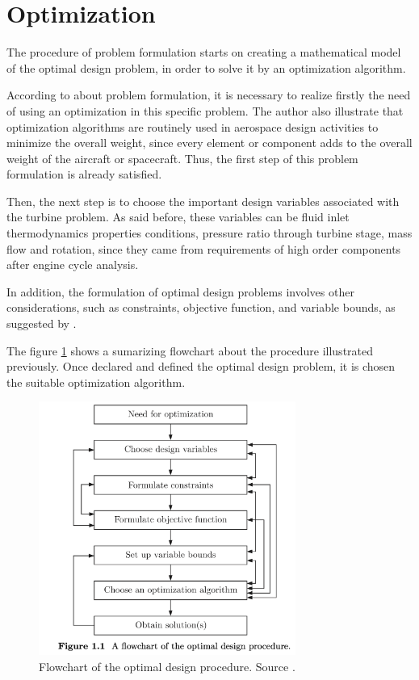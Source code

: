 \section{Optimization}
The procedure of problem formulation starts on creating a mathematical model of the optimal design problem, in order to solve it by an optimization algorithm.

According to \cite{Deb2012} about problem formulation, it is necessary to realize firstly the need of using an optimization in this specific problem. The author also illustrate that optimization algorithms are routinely used in aerospace design activities to minimize the overall weight, since every element or component adds to the overall weight of the aircraft or spacecraft. Thus, the first step of this problem formulation is already satisfied.

Then, the next step is to choose the important design variables associated with the turbine problem. As said before, these variables can be fluid inlet thermodynamics properties conditions, pressure ratio through turbine stage, mass flow and rotation, since they came from requirements of high order components after engine cycle analysis.

In addition, the formulation of optimal design problems involves other considerations, such as constraints, objective function, and variable bounds, as suggested by \cite{Deb2012}.

The figure \ref{fig:od_flowchart} shows a sumarizing flowchart about the procedure illustrated previously. Once declared and defined the optimal design problem, it is chosen the suitable optimization algorithm.

\begin{figure}[h]
    \centering
    \includegraphics[width=0.75\textwidth]{Cap3/od_flowchart.png}
    \caption{Flowchart of the optimal design procedure. Source \cite{Deb2012}.}
    \label{fig:od_flowchart}
\end{figure}


